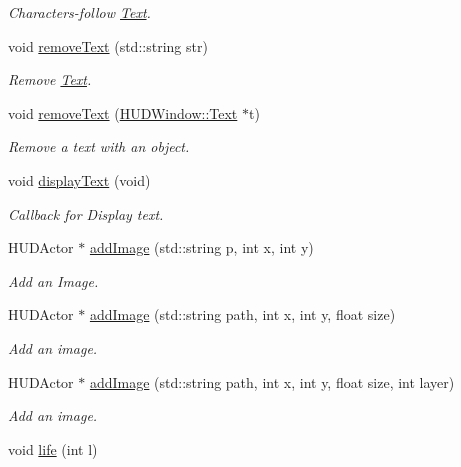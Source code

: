 \begin{DoxyCompactItemize}
\begin{DoxyCompactList}\small\item\em Characters-\/follow \hyperlink{class_h_u_d_window_1_1_text}{Text}. \end{DoxyCompactList}\item 
void \hyperlink{class_h_u_d_window_a0aedfd1f3c8354da1b69f1b592d4ad3e}{remove\+Text} (std\+::string str)
\begin{DoxyCompactList}\small\item\em Remove \hyperlink{class_h_u_d_window_1_1_text}{Text}. \end{DoxyCompactList}\item 
void \hyperlink{class_h_u_d_window_a1fee364ef03930d6302cc62a2ce8ff56}{remove\+Text} (\hyperlink{class_h_u_d_window_1_1_text}{H\+U\+D\+Window\+::\+Text} $\ast$t)
\begin{DoxyCompactList}\small\item\em Remove a text with an object. \end{DoxyCompactList}\item 
void \hyperlink{class_h_u_d_window_a12148d8845eaa5a663d816a4befba0dd}{display\+Text} (void)
\begin{DoxyCompactList}\small\item\em Callback for Display text. \end{DoxyCompactList}\item 
H\+U\+D\+Actor $\ast$ \hyperlink{class_h_u_d_window_ac9f25e99acf17e9bef2160725dc0d5f9}{add\+Image} (std\+::string p, int x, int y)
\begin{DoxyCompactList}\small\item\em Add an Image. \end{DoxyCompactList}\item 
H\+U\+D\+Actor $\ast$ \hyperlink{class_h_u_d_window_a65a770438d90ccde706a429893929680}{add\+Image} (std\+::string path, int x, int y, float size)
\begin{DoxyCompactList}\small\item\em Add an image. \end{DoxyCompactList}\item 
H\+U\+D\+Actor $\ast$ \hyperlink{class_h_u_d_window_a9eb6b2fbd2364591d56d75a0dfe0c8f9}{add\+Image} (std\+::string path, int x, int y, float size, int layer)
\begin{DoxyCompactList}\small\item\em Add an image. \end{DoxyCompactList}\item 
void \hyperlink{class_h_u_d_window_a8fc917fbfae792d046e90448c963100a}{life} (int l)

\end{DoxyCompactItemize}
